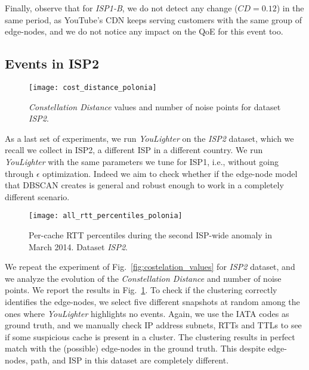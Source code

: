 \documentclass{acm_proc_article-sp}
\newcommand{\tool}{\textit{YouLighter}\xspace}
\newcommand{\distance}{\textit{Constellation Distance}\xspace}
\newcommand{\node}{{edge-node}\xspace}
\newcommand{\nodes}{{edge-nodes}\xspace}
\newcommand{\TApri}{\textit{ISP1-B}\xspace}
\newcommand{\TC}{\textit{ISP2}\xspace}
\begin{document}
Finally, observe that for \TApri, we do not detect any change ($CD=0.12$) in the same period, as YouTube's CDN keeps serving customers with the same group of \nodes, and we do not notice any impact on the QoE for this event too.


\subsection{Events in ISP2}

\begin{figure}[t!]
 \centering
 \texttt{[image: cost\_distance\_polonia]}
 \caption{\distance values and number of noise points for dataset \TC.}
\label{fig:costelation_polonia}
\end{figure}

As a last set of experiments, we run \tool on the \TC dataset, which we recall we collect in ISP2, a different ISP in a different country. We run \tool with the same parameters we tune for ISP1, i.e., without going through $\epsilon$ optimization.
Indeed we aim to check whether if the \node model that DBSCAN creates is general and robust enough to work in a completely different scenario.

\begin{figure}[t!]
\centering
\texttt{[image: all\_rtt\_percentiles\_polonia]}
\caption{Per-cache RTT percentiles during the second ISP-wide anomaly in March 2014. Dataset \TC.}
    \label{fig:CD_poland}
\end{figure}

We repeat the experiment of Fig.~\ref{fig:costelation_values} for \TC dataset, and we analyze the evolution of the \distance and number of noise points. We report the results in Fig.~\ref{fig:costelation_polonia}.
To check if the clustering correctly identifies the \nodes, we select five different snapshots at random among the ones where \tool highlights no events. Again, we use the IATA codes as ground truth, and we manually check IP address subnets, RTTs and TTLs to see if some suspicious cache is present in a cluster. The clustering results in perfect match with the (possible) \nodes in the ground truth.
This despite \nodes, path, and ISP in this dataset are completely different.
\end{document}
